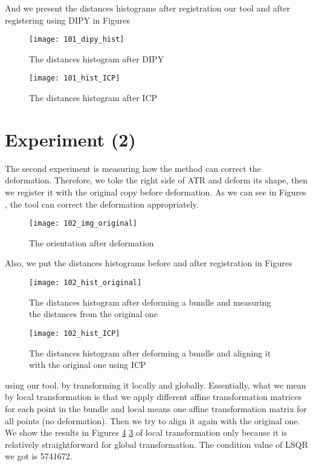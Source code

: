 \documentclass[../structure.tex]{subfiles}
\begin{document}
And we present the distances histograms after registration our tool and after registering using DIPY in Figures 

\begin{figure}[h!]
\centering
\texttt{[image: 101\_dipy\_hist]}
\captionsetup{justification=centering}
\caption{The distances histogram after DIPY}
\label{fig:dipy_hist}
\end{figure}

\begin{figure}[h!]
\centering
\texttt{[image: 101\_hist\_ICP]}
\captionsetup{justification=centering}
\caption{The distances histogram after ICP}
\label{fig:hist_ICP}
\end{figure}

\section{Experiment (2)}
The second experiment is measuring how the method can correct the deformation. Therefore, we toke the right side of ATR and deform its shape, then we register it with the original copy before deformation. As we can see in Figures , the tool can correct the deformation appropriately.

\begin{figure}[h!]
\centering
\texttt{[image: 102\_img\_original]}
\captionsetup{justification=centering}
\caption{The orientation after deformation}
\label{fig:img_original_def}
\end{figure}

Also, we put the distances histograms before and after registration in Figures 

\begin{figure}[h!]
\centering
\texttt{[image: 102\_hist\_original]}
\captionsetup{justification=centering}
\caption{The distances histogram after deforming a bundle and measuring the distances from the original one}
\label{fig:hist_original_def}
\end{figure}

\begin{figure}[h!]
\centering
\texttt{[image: 102\_hist\_ICP]}
\captionsetup{justification=centering}
\caption{The distances histogram after deforming a bundle and aligning it with the original one using ICP}
\label{fig:hist_icp_def}
\end{figure}

 using our tool. by transforming it locally and globally. Essentially, what we mean by local transformation is that we apply different affine transformation matrices for each point in the bundle and local means one affine transformation matrix for all points (no deformation). Then we try to align it again with the original one. We show the results in Figures \ref{fig:hist_original_def} \ref{fig:img_original_def} of local transformation only because it is relatively straightforward for global transformation. The condition value of LSQR we got is 5741672.
\end{document}
